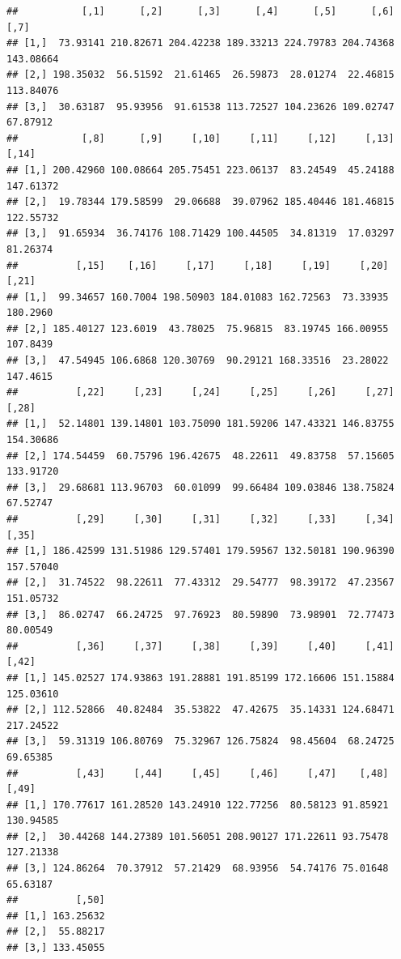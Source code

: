 \documentclass[
]{article}
\newenvironment{Shaded}{\begin{snugshade}}{\end{snugshade}}
\newcommand{\FunctionTok}[1]{\textcolor[rgb]{0.13,0.29,0.53}{\textbf{#1}}}
\newcommand{\NormalTok}[1]{#1}
\newcommand{\SpecialCharTok}[1]{\textcolor[rgb]{0.81,0.36,0.00}{\textbf{#1}}}
\begin{document}
\begin{Shaded}
\end{Shaded}

\begin{verbatim}
##           [,1]      [,2]      [,3]      [,4]      [,5]      [,6]      [,7]
## [1,]  73.93141 210.82671 204.42238 189.33213 224.79783 204.74368 143.08664
## [2,] 198.35032  56.51592  21.61465  26.59873  28.01274  22.46815 113.84076
## [3,]  30.63187  95.93956  91.61538 113.72527 104.23626 109.02747  67.87912
##           [,8]      [,9]     [,10]     [,11]     [,12]     [,13]     [,14]
## [1,] 200.42960 100.08664 205.75451 223.06137  83.24549  45.24188 147.61372
## [2,]  19.78344 179.58599  29.06688  39.07962 185.40446 181.46815 122.55732
## [3,]  91.65934  36.74176 108.71429 100.44505  34.81319  17.03297  81.26374
##          [,15]    [,16]     [,17]     [,18]     [,19]     [,20]    [,21]
## [1,]  99.34657 160.7004 198.50903 184.01083 162.72563  73.33935 180.2960
## [2,] 185.40127 123.6019  43.78025  75.96815  83.19745 166.00955 107.8439
## [3,]  47.54945 106.6868 120.30769  90.29121 168.33516  23.28022 147.4615
##          [,22]     [,23]     [,24]     [,25]     [,26]     [,27]     [,28]
## [1,]  52.14801 139.14801 103.75090 181.59206 147.43321 146.83755 154.30686
## [2,] 174.54459  60.75796 196.42675  48.22611  49.83758  57.15605 133.91720
## [3,]  29.68681 113.96703  60.01099  99.66484 109.03846 138.75824  67.52747
##          [,29]     [,30]     [,31]     [,32]     [,33]     [,34]     [,35]
## [1,] 186.42599 131.51986 129.57401 179.59567 132.50181 190.96390 157.57040
## [2,]  31.74522  98.22611  77.43312  29.54777  98.39172  47.23567 151.05732
## [3,]  86.02747  66.24725  97.76923  80.59890  73.98901  72.77473  80.00549
##          [,36]     [,37]     [,38]     [,39]     [,40]     [,41]     [,42]
## [1,] 145.02527 174.93863 191.28881 191.85199 172.16606 151.15884 125.03610
## [2,] 112.52866  40.82484  35.53822  47.42675  35.14331 124.68471 217.24522
## [3,]  59.31319 106.80769  75.32967 126.75824  98.45604  68.24725  69.65385
##          [,43]     [,44]     [,45]     [,46]     [,47]    [,48]     [,49]
## [1,] 170.77617 161.28520 143.24910 122.77256  80.58123 91.85921 130.94585
## [2,]  30.44268 144.27389 101.56051 208.90127 171.22611 93.75478 127.21338
## [3,] 124.86264  70.37912  57.21429  68.93956  54.74176 75.01648  65.63187
##          [,50]
## [1,] 163.25632
## [2,]  55.88217
## [3,] 133.45055
\end{verbatim}
\end{document}
